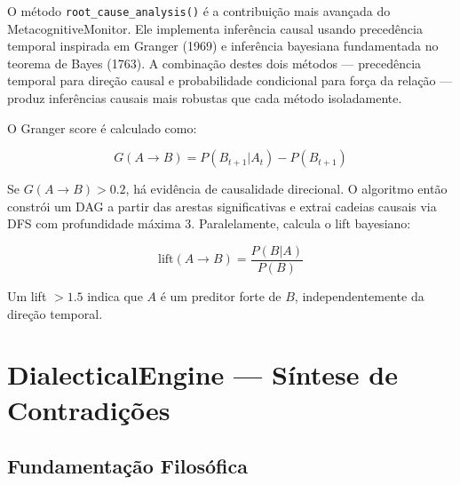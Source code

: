 O método \texttt{root\_cause\_analysis()} é a contribuição mais avançada do MetacognitiveMonitor. Ele implementa inferência causal usando precedência temporal inspirada em Granger (1969) e inferência bayesiana fundamentada no teorema de Bayes (1763). A combinação destes dois métodos — precedência temporal para direção causal e probabilidade condicional para força da relação — produz inferências causais mais robustas que cada método isoladamente.

O Granger score é calculado como:

\begin{equation}
G(A \rightarrow B) = P(B_{t+1} | A_t) - P(B_{t+1})
\label{eq:granger}
\end{equation}

Se $G(A \rightarrow B) > 0.2$, há evidência de causalidade direcional. O algoritmo então constrói um DAG a partir das arestas significativas e extrai cadeias causais via DFS com profundidade máxima 3. Paralelamente, calcula o lift bayesiano:

\begin{equation}
\text{lift}(A \rightarrow B) = \frac{P(B|A)}{P(B)}
\label{eq:lift}
\end{equation}

Um lift $> 1.5$ indica que $A$ é um preditor forte de $B$, independentemente da direção temporal.

\section{DialecticalEngine — Síntese de Contradições}

\subsection{Fundamentação Filosófica}

